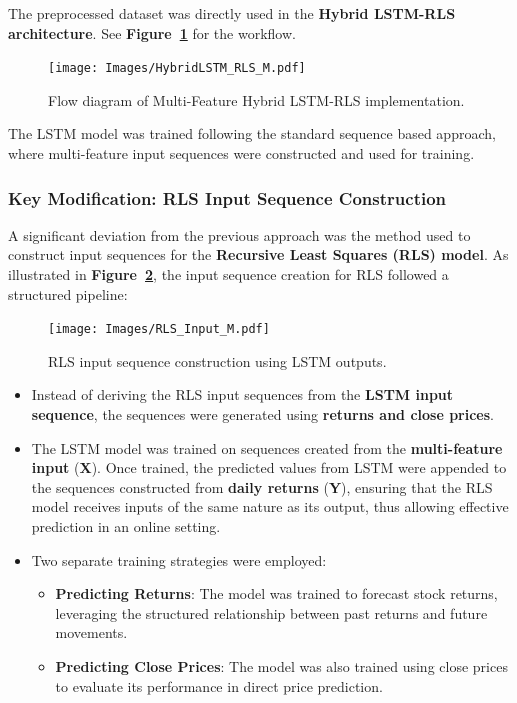 The preprocessed dataset was directly used in the \textbf{Hybrid LSTM-RLS architecture}. See \textbf{Figure~\ref{fig:HybridLSTM_RLS_M}} for the workflow.

\begin{figure}[h!]
    \centering
    \texttt{[image: Images/HybridLSTM\_RLS\_M.pdf]}
    \caption{Flow diagram of Multi-Feature Hybrid LSTM-RLS implementation.}
    \label{fig:HybridLSTM_RLS_M}
\end{figure}

The LSTM model was trained following the standard sequence based approach, where multi-feature input sequences were constructed and used for training.

\subsubsection{Key Modification: RLS Input Sequence Construction}

A significant deviation from the previous approach was the method used to construct input sequences for the \textbf{Recursive Least Squares (RLS) model}. As illustrated in \textbf{Figure~\ref{fig:RLS_Input_M}}, the input sequence creation for RLS followed a structured pipeline:

\begin{figure}[h!]
    \centering
    \texttt{[image: Images/RLS\_Input\_M.pdf]}
    \caption{RLS input sequence construction using LSTM outputs.}
    \label{fig:RLS_Input_M}
\end{figure}

\begin{itemize}
    \item Instead of deriving the RLS input sequences from the \textbf{LSTM input sequence}, the sequences were generated using \textbf{returns and close prices}.  
    \item The LSTM model was trained on sequences created from the \textbf{multi-feature input} (\textbf{X}). Once trained, the predicted values from LSTM were appended to the sequences constructed from \textbf{daily returns} (\textbf{Y}), ensuring that the RLS model receives inputs of the same nature as its output, thus allowing effective prediction in an online setting.
    \item Two separate training strategies were employed:  
    \begin{itemize}
        \item \textbf{Predicting Returns}: The model was trained to forecast stock returns, leveraging the structured relationship between past returns and future movements.  
        \item \textbf{Predicting Close Prices}: The model was also trained using close prices to evaluate its performance in direct price prediction.
    \end{itemize}
\end{itemize}

